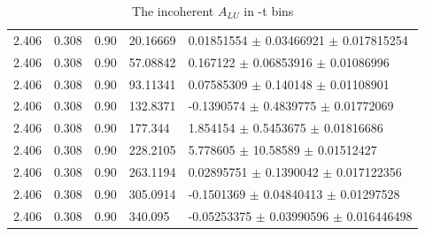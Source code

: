 \begin{table}[!h]
\begin{center}
\begin{tabular}{||l|l|l|l|l||}
   2.406 & 0.308 & 0.90 &    20.16669  &  0.01851554   $\pm$ 0.03466921    $\pm$ 0.017815254  \\
   2.406 & 0.308 & 0.90 &    57.08842  &  0.167122     $\pm$ 0.06853916    $\pm$ 0.01086996   \\
   2.406 & 0.308 & 0.90 &    93.11341  &  0.07585309   $\pm$ 0.140148      $\pm$ 0.01108901   \\
   2.406 & 0.308 & 0.90 &    132.8371  &  -0.1390574   $\pm$ 0.4839775     $\pm$ 0.01772069   \\
   2.406 & 0.308 & 0.90 &    177.344   &  1.854154     $\pm$ 0.5453675     $\pm$ 0.01816686   \\ 
   2.406 & 0.308 & 0.90 &    228.2105  &  5.778605     $\pm$ 10.58589      $\pm$ 0.01512427   \\
   2.406 & 0.308 & 0.90 &    263.1194  &  0.02895751   $\pm$ 0.1390042     $\pm$ 0.017122356  \\
   2.406 & 0.308 & 0.90 &    305.0914  &  -0.1501369   $\pm$ 0.04840413    $\pm$ 0.01297528   \\
   2.406 & 0.308 & 0.90 &    340.095   &  -0.05253375  $\pm$ 0.03990596    $\pm$ 0.016446498  \\
 \hline
 \hline
 \end{tabular}
 \caption{The incoherent $A_{LU}$ in -t bins}
 \label{table:InCoh_t_BSA}
 \end{center}
\end{table}



